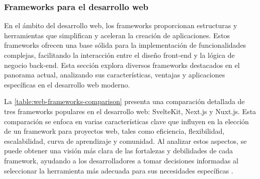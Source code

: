 \subsubsection{Frameworks para el desarrollo web}

En el ámbito del desarrollo web, los frameworks proporcionan estructuras y herramientas que simplifican y aceleran la creación de aplicaciones. Estos frameworks ofrecen una base sólida para la implementación de funcionalidades complejas, facilitando la interacción entre el diseño front-end y la lógica de negocio back-end. Esta sección explora diversos frameworks destacados en el panorama actual, analizando sus características, ventajas y aplicaciones específicas en el desarrollo web moderno.

La \autoref{table:web-frameworks-comparison} presenta una comparación detallada de tres frameworks populares en el desarrollo web: SvelteKit, Next.js y Nuxt.js. Esta comparación se enfoca en varias características clave que influyen en la elección de un framework para proyectos web, tales como eficiencia, flexibilidad, escalabilidad, curva de aprendizaje y comunidad. Al analizar estos aspectos, se puede obtener una visión más clara de las fortalezas y debilidades de cada framework, ayudando a los desarrolladores a tomar decisiones informadas al seleccionar la herramienta más adecuada para sus necesidades específicas \autocite{riva_real-world_2022,lazuardy_2022_modern,kok_hands-nuxt_2020,halliday_vue_2018,wernersson_choosing_2023,kroon_celander_comparative_2024,c_ragkhitwetsagul_jscefr_2024,vepsalainen_state_2023}.

